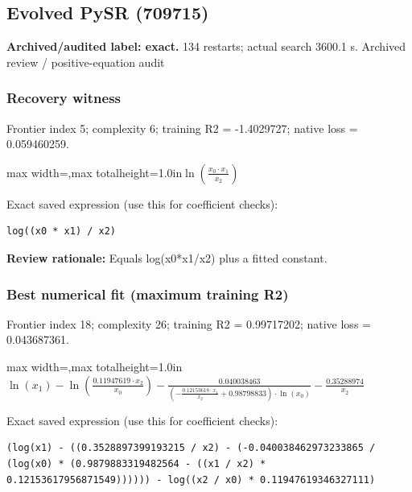 \documentclass[10pt,letterpaper,landscape]{article}
\begin{document}
\begin{minipage}[t]{0.485\textwidth}
\subsection*{Evolved PySR (709715)}
\textbf{Archived/audited label: exact.} 134 restarts; actual search 3600.1 s.
{\small Archived review / positive-equation audit}
\subsubsection*{Recovery witness}
Frontier index 5; complexity 6; training R2 = -1.4029727; native loss = 0.059460259.
\begin{center}\begin{adjustbox}{max width=\linewidth,max totalheight=1.0in}$\displaystyle \ln{\left(\frac{x_{0} \cdot x_{1}}{x_{2}} \right)}$\end{adjustbox}\end{center}
{\scriptsize Exact saved expression (use this for coefficient checks):}
\begin{lstlisting}
log((x0 * x1) / x2)
\end{lstlisting}
{\small\textbf{Review rationale:} Equals log(x0*x1/x2) plus a fitted constant.}
\subsubsection*{Best numerical fit (maximum training R2)}
Frontier index 18; complexity 26; training R2 = 0.99717202; native loss = 0.043687361.
\begin{center}\begin{adjustbox}{max width=\linewidth,max totalheight=1.0in}$\displaystyle \ln{\left(x_{1} \right)} - \ln{\left(\frac{0.11947619 \cdot x_{2}}{x_{0}} \right)} - \frac{0.040038463}{\left(- \frac{0.12153618 \cdot x_{1}}{x_{2}} + 0.98798833\right) \cdot \ln{\left(x_{0} \right)}} - \frac{0.35288974}{x_{2}}$\end{adjustbox}\end{center}
{\scriptsize Exact saved expression (use this for coefficient checks):}
\begin{lstlisting}
(log(x1) - ((0.3528897399193215 / x2) - (-0.040038462973233865 / (log(x0) * (0.9879883319482564 - ((x1 / x2) * 0.12153617956871549)))))) - log((x2 / x0) * 0.11947619346327111)
\end{lstlisting}
\end{minipage}
\clearpage{}\label{ideal_gas-10006}
\end{document}
